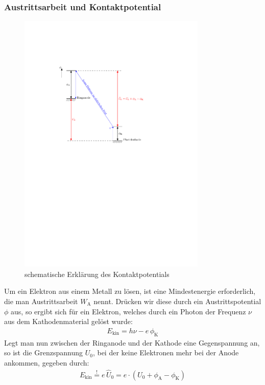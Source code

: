 \documentclass[11pt, a4paper]{article}
\numberwithin{equation}{section}
\begin{document}
\subsubsection{Austrittsarbeit und Kontaktpotential}
\begin{figure}
	\centering
	\includegraphics[width=0.8\textwidth]{./figures/kontaktspannung.pdf}
	\caption{schematische Erklärung des Kontaktpotentials}
	\label{fig:kontaktpotential}
\end{figure}
Um ein Elektron aus einem Metall zu lösen, ist eine Mindestenergie erforderlich, die man Austrittsarbeit $W_\mathrm{A}$ nennt.
Drücken wir diese durch ein Austrittspotential $\phi$ aus, so ergibt sich für ein Elektron, welches durch ein Photon der Frequenz $\nu$ aus dem Kathodenmaterial gelöst wurde:
\begin{align*}
	E_\mathrm{kin} = h \nu - e \, \phi_\mathrm{K}
\end{align*}
Legt man nun zwischen der Ringanode und der Kathode eine Gegenspannung an, so ist die Grenzspannung $U_0$, bei der keine Elektronen mehr bei der Anode ankommen, gegeben durch:
\begin{align*}
	E_\mathrm{kin} \stackrel{!}{=} e \, \hat{U}_0 = e \cdot \left( U_0 + \phi_\mathrm{A} - \phi_\mathrm{K}\right)
\end{align*}
\end{document}
